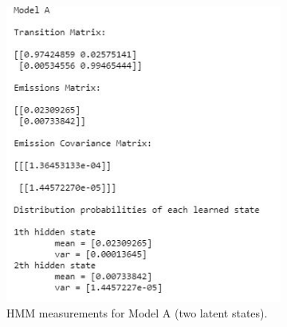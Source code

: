 \begin{figure}[H]
     \centering
     \begin{subfigure}[b]{0.45\textwidth}
         \centering
         \includegraphics[width=\textwidth]{imgs/model_a_regime.JPG}
         \caption{HMM measurements for Model A (two latent states).}
         \label{fig:model_a_regime}
     \end{subfigure}
     \hfill
     \begin{subfigure}[b]{0.45\textwidth}
         \centering

\end{subfigure}
\end{figure}

